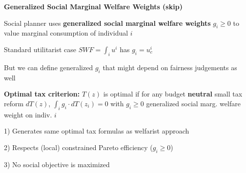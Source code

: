 \documentclass[landscape]{slides}
\begin{document}
\begin{slide}

\end{slide}


\begin{slide}

\end{slide}



%
%
%
%
%
%
%

\begin{slide}
\begin{center}
{\bf Generalized Social Marginal Welfare Weights (skip)}
\end{center}
Social planner uses \textbf{generalized social marginal welfare weights} $g_i \geq 0$ to value marginal consumption
of individual $i$

Standard utilitarist case $SWF=\int_i u^i$ has $g_i=u^i_c$

But we can define generalized $g_i$ that might depend on fairness judgements as well

\textbf{Optimal tax criterion:} $T(z)$ is optimal if for any budget \textbf{neutral} small tax reform $dT(z)$,
$\int_i g_i \cdot dT(z_i)=0$ with $g_i \geq 0$ generalized social marg. welfare weight on indiv. $i$


1) Generates same optimal tax formulas as welfarist approach 

2) Respects (local) constrained Pareto efficiency ($g_i \geq 0$)

3) No social objective is maximized
\end{slide}
\end{document}
